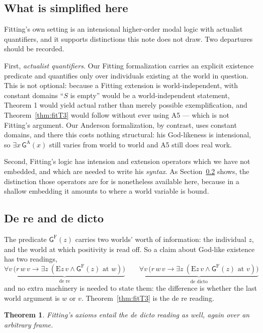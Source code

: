 \documentclass[11pt]{article}
\theoremstyle{plain}
\newtheorem{theorem}{Theorem}
\theoremstyle{definition}
\newcommand{\Gd}{\mathsf{G}}
\begin{document}
\subsection{What is simplified here}\label{sec:variantscaveats}

Fitting's own setting is an intensional higher-order modal logic with actualist
quantifiers, and it supports distinctions this note does not draw. Two
departures should be recorded.

First, \emph{actualist quantifiers}. Our Fitting formalization carries an
explicit existence predicate and quantifies only over individuals existing at
the world in question. This is not optional: because a Fitting extension is
world-independent, with constant domains ``$S$ is empty'' would be a
world-independent statement, Theorem 1 would yield actual rather than merely
possible exemplification, and Theorem~\ref{thm:fitT3} would follow without ever
using A5 --- which is not Fitting's argument. Our Anderson formalization, by
contrast, uses constant domains, and there this costs nothing structural: his
God-likeness is intensional, so $\exists x\,\Gd^{\mathrm{A}}(x)$ still varies
from world to world and A5 still does real work.

Second, Fitting's logic has intension and extension operators which we have not
embedded, and which are needed to write his \emph{syntax}. As
Section~\ref{sec:derededicto} shows, the distinction those operators are for is
nonetheless available here, because in a shallow embedding it amounts to where
a world variable is bound.

\subsection{De re and de dicto}\label{sec:derededicto}

The predicate $\Gd^{\mathrm{F}}(z)$ carries two worlds' worth of information:
the individual $z$, and the world at which positivity is read off. So a claim
about God-like existence has two readings,
\[
  \underbrace{\forall v\,\bigl(r\,w\,v \to \exists z\ (\mathrm{E}z\,v \wedge \Gd^{\mathrm{F}}(z)\text{ at }w)\bigr)}_{\text{de re}}
  \qquad
  \underbrace{\forall v\,\bigl(r\,w\,v \to \exists z\ (\mathrm{E}z\,v \wedge \Gd^{\mathrm{F}}(z)\text{ at }v)\bigr)}_{\text{de dicto}}
\]
and no extra machinery is needed to state them: the difference is whether the
last world argument is $w$ or $v$. Theorem~\ref{thm:fitT3} is the de re
reading.

\begin{theorem}\label{thm:fitdd}
Fitting's axioms entail the de dicto reading as well, again over an arbitrary
frame.
\end{theorem}
\end{document}
